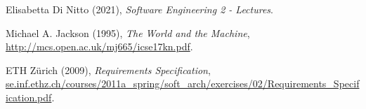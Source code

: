 \begin{thebibliography}{9}
Elisabetta Di Nitto (2021),
\emph{Software Engineering 2 - Lectures}.

Michael A. Jackson (1995),
\emph{The World and the Machine},
\url{http://mcs.open.ac.uk/mj665/icse17kn.pdf}.

ETH Zürich (2009),
\emph{Requirements Specification},
\url{se.inf.ethz.ch/courses/2011a_spring/soft_arch/exercises/02/Requirements_Specification.pdf}.

\end{thebibliography}